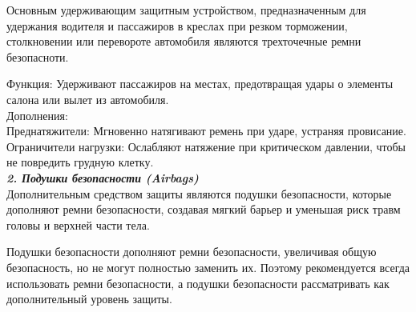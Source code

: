  Основным удерживающим  защитным устройством, предназначенным для удержания водителя и пассажиров в креслах при резком торможении, столкновении или перевороте автомобиля являются трехточечные ремни безопасноти.
 
Функция: Удерживают пассажиров на местах, предотвращая удары о элементы салона или вылет из автомобиля.\\
Дополнения:\\
Преднатяжители: Мгновенно натягивают ремень при ударе, устраняя провисание.\\
Ограничители нагрузки: Ослабляют натяжение при критическом давлении, чтобы не повредить грудную клетку.\\
\textsl{{\textbf{2. Подушки безопасности (Airbags)}}}\\
Дополнительным средством защиты являются подушки безопасности, которые дополняют ремни безопасности, создавая мягкий барьер и уменьшая риск травм головы и верхней части тела.  

Подушки безопасности дополняют ремни безопасности, увеличивая общую безопасность, но не могут полностью заменить их. Поэтому рекомендуется всегда использовать ремни безопасности, а подушки безопасности рассматривать как дополнительный уровень защиты.

